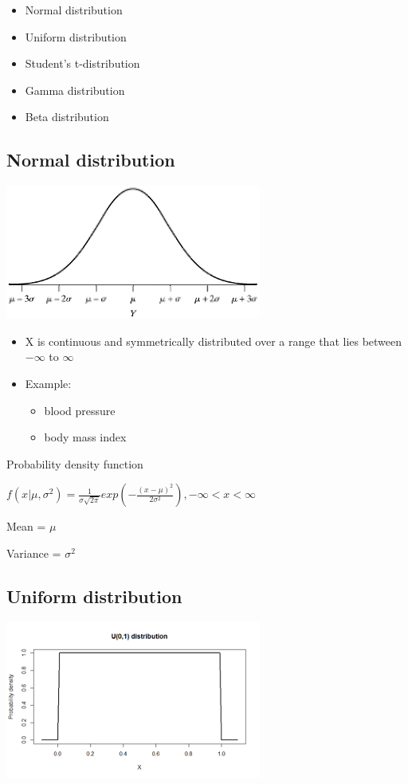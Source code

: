 \documentclass[
]{book}
\providecommand{\tightlist}{%
  \setlength{\itemsep}{0pt}\setlength{\parskip}{0pt}}
\begin{document}
\begin{itemize}
\tightlist
\item
  Normal distribution
\item
  Uniform distribution
\item
  Student's t-distribution
\item
  Gamma distribution
\item
  Beta distribution
\end{itemize}

\hypertarget{normal-distribution-1}{%
\subsection{Normal distribution}\label{normal-distribution-1}}

\includegraphics[width=0.5\linewidth]{./2_73}

\begin{itemize}
\tightlist
\item
  X is continuous and symmetrically distributed over a range that lies between \(-\infty\) to \(\infty\)
\item
  Example:

  \begin{itemize}
  \tightlist
  \item
    blood pressure
  \item
    body mass index
  \end{itemize}
\end{itemize}

Probability density function

\(f(x|\mu,\sigma^2)=\frac{1}{\sigma\sqrt{2\pi}}exp\left(-\frac{(x-\mu)^2}{2\sigma^2}\right),-\infty<x<\infty\)

Mean = \(\mu\)

Variance = \(\sigma^2\)

\hypertarget{uniform-distribution}{%
\subsection{Uniform distribution}\label{uniform-distribution}}

\includegraphics[width=0.5\linewidth]{./2_74}
\end{document}
